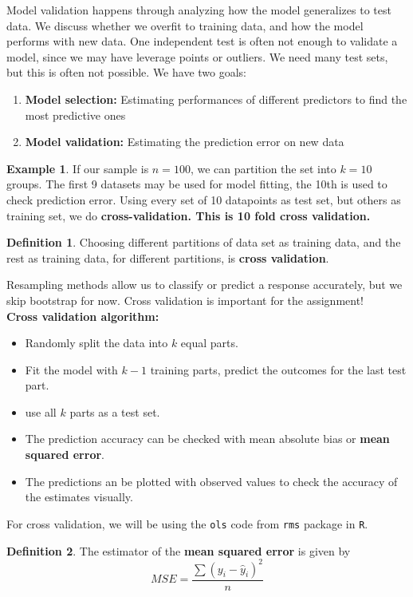 \documentclass[12pt, a4paper]{article}
\theoremstyle{definition}
\newtheorem{definition}{Definition}
\newtheorem{example}{Example}
\newcommand{\f}{\frac}
\begin{document}
	Model validation happens through analyzing how the model generalizes to test data. We discuss whether we overfit to training data, and how the model performs with new data. One independent test is often not enough to validate a model, since we may have leverage points or outliers. We need many test sets, but this is often not possible. We have two goals:
	\begin{enumerate}
		\item {\bf Model selection:} Estimating performances of different predictors to find the most predictive ones
		\item {\bf Model validation:} Estimating the prediction error on new data
	\end{enumerate}
	\begin{example}
		If our sample is $n=100$, we can partition the set into $k=10$ groups. The first 9 datasets may be used for model fitting, the 10th is used to check prediction error. Using every set of 10 datapoints as test set, but others as training set, we do \bf{cross-validation}. This is {\bf 10 fold cross validation}.
	\end{example}
	\begin{definition}
		Choosing different partitions of data set as training data, and the rest as training data, for different partitions, is {\bf cross validation}.
	\end{definition}
	Resampling methods allow us to classify or predict a response accurately, but we skip bootstrap for now. Cross validation is important for the assignment!\\
	
	{\bf Cross validation algorithm:}
	\begin{itemize}
		\item Randomly split the data into $k$ equal parts. 
		\item Fit the model with $k-1$ training parts, predict the outcomes for the last test part.
		\item use all $k$ parts as a test set.
		\item The prediction accuracy can be checked with mean absolute bias or {\bf mean squared error}. 
		\item The predictions an be plotted with observed values to check the accuracy of the estimates visually.
	\end{itemize}

	For cross validation, we will be using the \verb*|ols| code from \verb*|rms| package in \verb*|R|.
	
	\begin{definition}
		The estimator of the {\bf mean squared error} is given by
		$$
			MSE = \f{\sum (y_i - \hat y_i)^2}{n}
		$$
	\end{definition}
\end{document}
